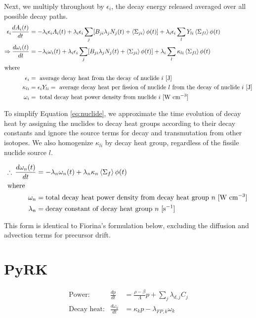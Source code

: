 \documentclass[letterpaper,11pt]{article}
\begin{document}
Next, we multiply throughout by $\epsilon_i$, the decay energy released
averaged over all possible decay paths.
%
\begin{align}
\epsilon_i \frac{dA_i (t)}{dt} &= - \lambda_i \epsilon_i A_i (t) + \lambda_i
\epsilon_i \sum_j [B_{ji} \lambda_j N_j (t) + \left<\Sigma_{ji}\right> \phi (t)]
+ \lambda_i \epsilon_i \sum_l
Y_{li} \left< \Sigma_{fl} \right> \phi (t) \\
\Rightarrow \frac{d\omega_i (t)}{dt} &= - \lambda_i \omega_i (t) + \lambda_i
\epsilon_i \sum_j [B_{ji}
\lambda_j N_j (t) + \left<\Sigma_{ji}\right> \phi (t)] + \lambda_i \sum_l
\kappa_{li} \left< \Sigma_{fl} \right> \phi (t) \label{eq:nuclide} \\
\intertext{where}
\epsilon_i &= \text{ average decay heat from the decay of nuclide }i \text{ [J]} \nonumber \\
\kappa_{li} &= \epsilon_i Y_{li} = \text{ average decay heat per fission of nuclide $l$ from the decay of nuclide }i \text{ [J]} \nonumber \\
\omega_i &= \text{ total decay heat power density from nuclide }i \text{ [W
cm$^{-3}$]} \nonumber
\end{align}

To simplify Equation \ref{eq:nuclide}, we approximate the time evolution of
decay heat by assigning the nuclides to
decay heat groups according to their decay constants and
ignore the source terms for decay and transmutation from other isotopes. We
also homogenize $\kappa_{li}$ by decay heat group,
regardless of the fissile nuclide source $l$.

\begin{align}
\therefore \, \frac{d\omega_n (t)}{dt} &= - \lambda_n \omega_n (t) + \lambda_n
\kappa_{n} \left< \Sigma_{f} \right> \phi (t) \\
\intertext{where}
\omega_n &= \text{total decay heat power density from decay heat group $n$
[W cm$^{-3}$] \nonumber} \\
\lambda_n &= \text{decay constant of decay heat group $n$ [s$^{-1}$]}
\nonumber
\end{align}

This form is identical to Fiorina's formulation below, excluding the diffusion
and advection terms for precursor drift.

%
\section*{PyRK}
%
\begin{align}
	&\text{Power:} & \frac{dp}{dt} &= \frac{\rho - \beta}{\Lambda} p + \sum_j \lambda_{d,j} C_j & \\
	&\text{Decay heat:} & \frac{d\omega_k}{dt} &= \kappa_k p - \lambda_{FP,k} \omega_k & \label{eq:2}
\end{align}
\end{document}
